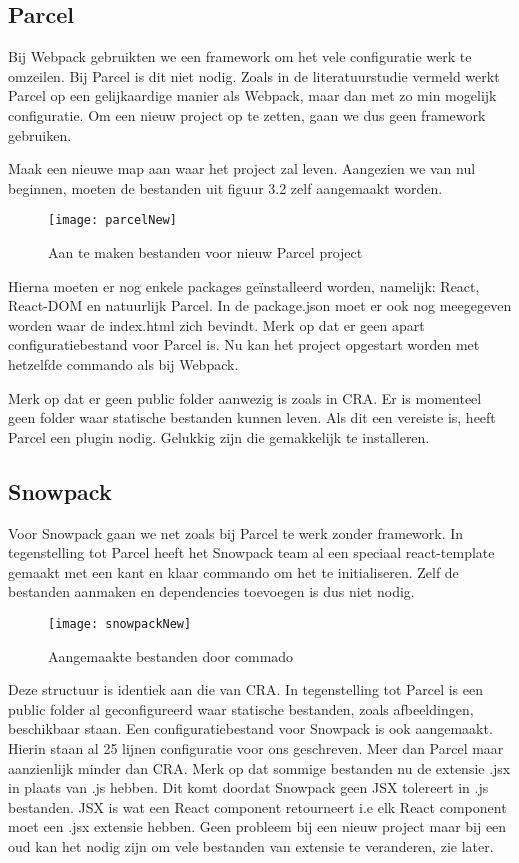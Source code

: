 \subsection{Parcel}
Bij Webpack gebruikten we een framework om het vele configuratie werk te omzeilen. Bij Parcel is dit niet nodig. Zoals in de literatuurstudie vermeld werkt Parcel op een gelijkaardige manier als Webpack, maar dan met zo min mogelijk configuratie. Om een nieuw project op te zetten, gaan we dus geen framework gebruiken.

Maak een nieuwe map aan waar het project zal leven. Aangezien we van nul beginnen, moeten de bestanden uit figuur 3.2 zelf aangemaakt worden.

\begin{figure}[h]
    \texttt{[image: parcelNew]}
        \centering
        \caption[]{Aan te maken bestanden voor nieuw Parcel project}
    \end{figure}

    Hierna moeten er nog enkele packages geïnstalleerd worden, namelijk: React, React-DOM en natuurlijk Parcel. In de package.json moet er ook nog meegegeven worden waar de index.html zich bevindt. Merk op dat er geen apart configuratiebestand voor Parcel is. Nu kan het project opgestart worden met hetzelfde commando als bij Webpack.

    Merk op dat er geen public folder aanwezig is zoals in CRA. Er is momenteel geen folder waar statische bestanden kunnen leven. Als dit een vereiste is, heeft Parcel een plugin nodig. Gelukkig zijn die gemakkelijk te installeren.

\subsection{Snowpack}
Voor Snowpack gaan we net zoals bij Parcel te werk zonder framework. In tegenstelling tot Parcel heeft het Snowpack team al een speciaal react-template gemaakt met een kant en klaar commando om het te initialiseren. Zelf de bestanden aanmaken en dependencies toevoegen is dus niet nodig.


\begin{figure}[h]
    \texttt{[image: snowpackNew]}
        \centering
        \caption[Aangemaakte bestanden door Snowpack commando]{Aangemaakte bestanden door commado}
    \end{figure}

Deze structuur is identiek aan die van CRA. In tegenstelling tot Parcel is een public folder al geconfigureerd waar statische bestanden, zoals afbeeldingen, beschikbaar staan. Een configuratiebestand voor Snowpack is ook aangemaakt. Hierin staan al 25 lijnen configuratie voor ons geschreven. Meer dan Parcel maar aanzienlijk minder dan CRA. Merk op dat sommige bestanden nu de extensie .jsx in plaats van .js hebben. Dit komt doordat Snowpack geen JSX tolereert in .js bestanden. JSX is wat een React component retourneert i.e elk React component moet een .jsx extensie hebben. Geen probleem bij een nieuw project maar bij een oud kan het nodig zijn om vele bestanden van extensie te veranderen, zie later.

